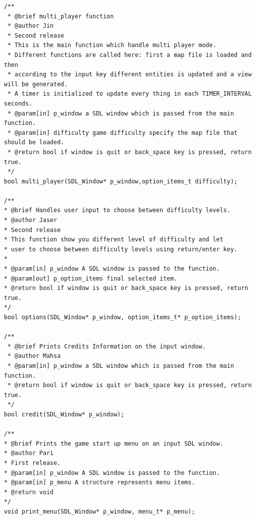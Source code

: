 \begin{verbatim}
/**
 * @brief multi_player function
 * @author Jin 
 * Second release
 * This is the main function which handle multi player mode.
 * Different functions are called here: first a map file is loaded and then
 * according to the input key different entities is updated and a view will be generated.
 * A timer is initialized to update every thing in each TIMER_INTERVAL seconds.
 * @param[in] p_window a SDL window which is passed from the main function.
 * @param[in] difficulty game difficulty specify the map file that should be loaded.
 * @return bool if window is quit or back_space key is pressed, return true.
 */
bool multi_player(SDL_Window* p_window,option_items_t difficulty);

/**
* @brief Handles user input to choose between difficulty levels.
* @author Jaser
* Second release
* This function show you different level of difficulty and let
* user to choose between difficulty levels using return/enter key.
*
* @param[in] p_window A SDL window is passed to the function.
* @param[out] p_option_items final selected item.
* @return bool if window is quit or back_space key is pressed, return true.
*/
bool options(SDL_Window* p_window, option_items_t* p_option_items);

/**
 * @brief Prints Credits Information on the input window.
 * @author Mahsa
 * @param[in] p_window a SDL window which is passed from the main function.
 * @return bool if window is quit or back_space key is pressed, return true.
 */
bool credit(SDL_Window* p_window);

/**
* @brief Prints the game start up menu on an input SDL window.
* @author Pari
* First release.
* @param[in] p_window A SDL window is passed to the function.
* @param[in] p_menu A structure represents menu items.
* @return void
*/
void print_menu(SDL_Window* p_window, menu_t* p_menu);
\end{verbatim}